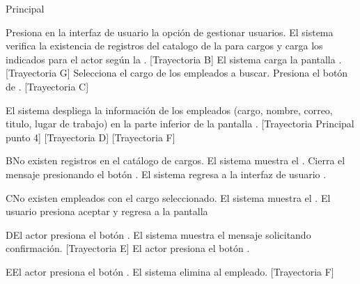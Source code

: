 \begin{UCtrayectoria}{Principal}
	
	\UCpaso[\UCactor] Presiona en la interfaz de usuario  la opción de gestionar usuarios. 
	\UCpaso  El sistema verifica la existencia de registros del catalogo de la  para cargos  y carga los indicados para el actor según la  . [Trayectoria B] 
	\UCpaso El sistema carga la pantalla  . [Trayectoria G] 
	\UCpaso[\UCactor] Selecciona el cargo de los empleados a buscar. 
	\UCpaso[\UCactor]  Presiona el botón de .  [Trayectoria C] 
	
	\UCpaso El sistema despliega la información de los empleados (cargo, nombre, correo, titulo, lugar de trabajo) en la parte inferior de la pantalla . [Trayectoria Principal punto 4] [Trayectoria D] [Trayectoria F] 
\end{UCtrayectoria}

\begin{UCtrayectoriaA}{B}{No existen registros en el catálogo de cargos.}
	\UCpaso     El sistema muestra el .
	\UCpaso[\UCactor] Cierra el mensaje presionando el botón .
	\UCpaso El sistema regresa a la interfaz de usuario .
\end{UCtrayectoriaA}

\begin{UCtrayectoriaA}{C}{No existen  empleados con el cargo seleccionado.}
	\UCpaso     El sistema muestra el .
	\UCpaso[\UCactor] El usuario presiona aceptar y regresa a la pantalla   
\end{UCtrayectoriaA}


\begin{UCtrayectoriaA}{D}{El actor presiona el botón .}
	\UCpaso El sistema muestra el mensaje  solicitando confirmación. [Trayectoria E]
	\UCpaso[\UCactor] El actor presiona el botón .
\end{UCtrayectoriaA}

\begin{UCtrayectoriaA}{E}{El actor presiona el botón .}
	\UCpaso     El sistema elimina al empleado. [Trayectoria F]   
\end{UCtrayectoriaA}

